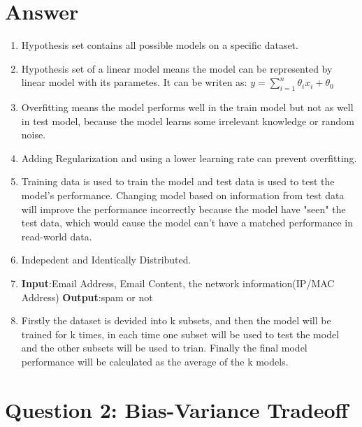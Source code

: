 \documentclass[
	12pt, %
]{fphw}
\begin{document}
\section*{Answer}
\begin{enumerate}
	\itemsep0.3em
	\parskip0.3em
	\item Hypothesis set contains all possible models on a specific dataset.
	\item Hypothesis set of a linear model means the model can be represented by linear model with its parametes. It can be writen as: $y = \sum_{i = 1}^{n}\theta_i x_i+\theta_0  $
	\item Overfitting means the model performs well in the train model but not as well in test model, because the model learns some irrelevant knowledge or random noise. 
	\item Adding Regularization and using a lower learning rate can prevent overfitting.
	\item Training data is used to train the model and test data is used to test the model's performance. Changing model based on information from test data will improve the performance incorrectly 
	because the model have "seen" the test data, which would cause the model can't have a matched performance in read-world data.
	\item Indepedent and Identically Distributed.
	\item \textbf{Input}:Email Address, Email Content, the network information(IP/MAC Address) \textbf{Output}:spam or not
	\item Firstly the dataset is devided into k subsets, and then the model will be trained for k times, in each time one subset will be used to test the model and the other subsets will be used to trian. Finally the final model performance will be calculated as the average of the k models.
\end{enumerate}


\section*{Question 2: Bias-Variance Tradeoff}
\end{document}
